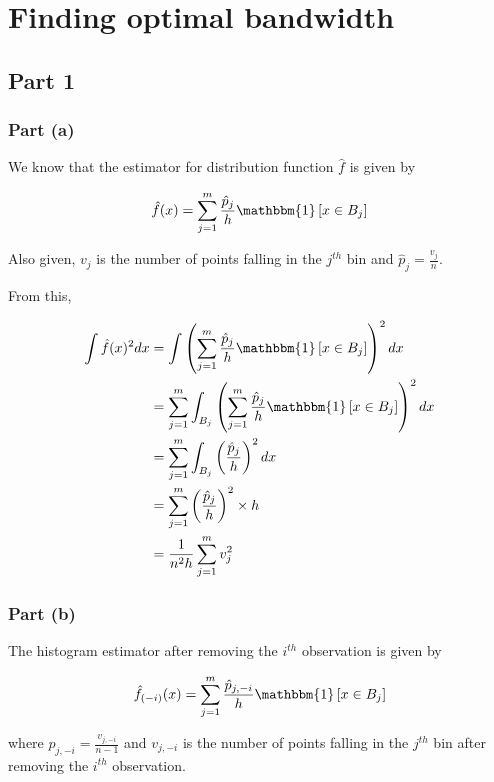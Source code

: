 \section{Finding optimal bandwidth}

\subsection{Part 1}
\subsubsection{Part (a)}

We know that the estimator for distribution function $\hat{f}$ is given by

\begin{equation}
    \hat{f}(x) = \sum_{j=1}^m \frac{\hat{p}_j}{h} \mathbbm{1}\left[x \in B_j\right]
\end{equation}

Also given, $v_j$ is the number of points falling in the $j^{th}$ bin and $\hat{p}_j = \frac{v_j}{n}$.

From this,

\begin{align*}
    \int \hat{f}(x)^2 dx &= \int \left(\sum_{j=1}^m \frac{\hat{p}_j}{h} \mathbbm{1}\left[x \in B_j\right]\right)^2 dx \\
    &= \sum_{j=1}^m \int_{B_j} \left(\sum_{j=1}^m \frac{\hat{p}_j}{h} \mathbbm{1}\left[x \in B_j\right]\right)^2 dx \\
    &= \sum_{j=1}^m \int_{B_j} \left(\frac{\hat{p}_j}{h}\right)^2 dx \\
    &= \sum_{j=1}^m \left(\frac{\hat{p}_j}{h}\right)^2 \times h \\
    &= \frac{1}{n^2h} \sum_{j=1}^m v_j^2
\end{align*}

\subsubsection{Part (b)}

The histogram estimator after removing the $i^{th}$ observation is given by

\begin{equation}
    \hat{f}_{(-i)}(x) = \sum_{j=1}^m \frac{\hat{p}_{j, -i}}{h} \mathbbm{1}\left[x \in B_j\right]
\end{equation}

where $\hat{p}_{j, -i} = \frac{v_{j, -i}}{n-1}$ and $v_{j, -i}$ is the number of points falling in the $j^{th}$ bin after removing the $i^{th}$ observation.

